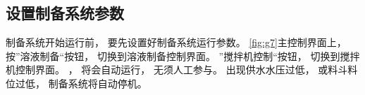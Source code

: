 \documentclass[UTF8,a4paper,12pt,titlepage]{ctexart}
\begin{document}
   \subsection{设置制备系统参数}\label{sec:sg5}
      制备系统开始运行前，
      要先设置好制备系统运行参数。
      \ref{fig:g7}主控制界面上，
      按”溶液制备“按钮，
      切换到溶液制备控制界面。
      ”搅拌机控制“按钮，
      切换到搅拌机控制界面。
      ，
      将会自动运行，
      无须人工参与。
      出现供水水压过低，
      或料斗料位过低，
      制备系统将自动停机。

      \newpage

      \begin{figure}[h]
         \centering
\end{figure}
\end{document}
